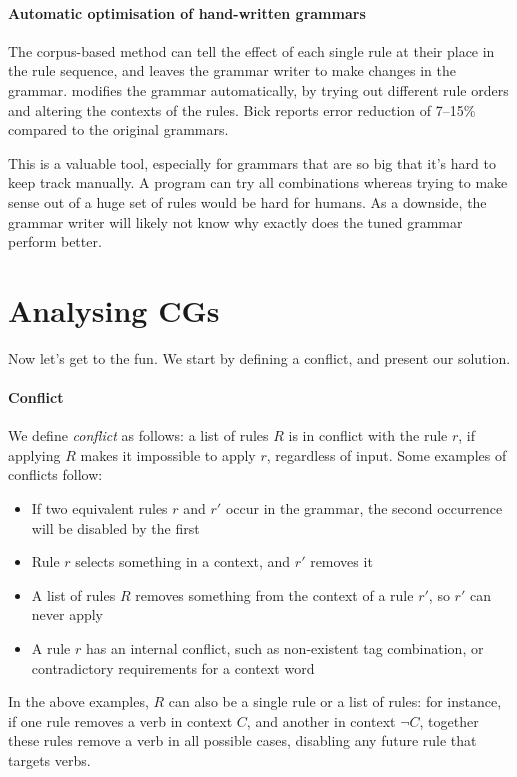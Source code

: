 \paragraph{Automatic optimisation of hand-written grammars }

The corpus-based method can tell the effect of each single rule at their place in the rule sequence, and leaves the grammar writer to make changes in the grammar.
\cite{bick2013tuning} modifies the grammar automatically, by trying
out different rule orders and altering the contexts of the rules. 
Bick reports error reduction of 7--15\% compared to the original grammars.

This is a valuable tool, especially for grammars that are so big that it's hard to keep track manually. A program can try all combinations whereas trying to make sense out of a huge set of rules would be hard for humans.
As a downside, the grammar writer will likely not know why exactly does the tuned grammar perform better.


\section{Analysing CGs}
\label{sec:sectionCGana}

Now let's get to the fun. We start by defining a conflict, and present our solution.

\paragraph{Conflict}

We define \emph{conflict} as follows: a list of rules $R$ is in conflict with the rule $r$, if applying $R$ makes it impossible to apply $r$, regardless of input.
Some examples of conflicts follow:

\begin{itemize}
\item If two equivalent rules $r$ and $r'$ occur in the grammar, the second occurrence will be disabled by the first
\item Rule $r$ selects something in a context, and $r'$ removes it
\item A list of rules $R$ removes something from the context of a rule $r'$, so $r'$ can never apply
\item A rule $r$ has an internal conflict, such as non-existent
tag combination, or contradictory requirements for a context word
\end{itemize}
In the above examples, $R$ can also be a single rule or a list of rules: for instance, if one rule removes a verb in
context $C$, and another in context $\neg C$, together these rules
remove a verb in all possible cases, disabling any future rule that
targets verbs.


